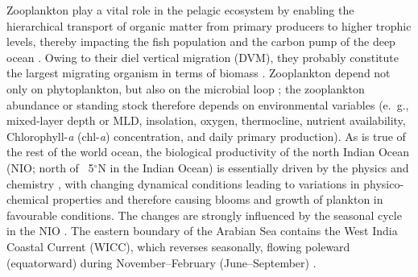 \documentclass[authoryear,review,11pt]{elsarticle}
\newcommand{\chla}{chl-{\emph{a}}}
\begin{document}
Zooplankton play a vital role in the pelagic ecosystem by enabling the hierarchical transport of organic matter from primary producers to higher trophic levels, thereby impacting the fish population \citep{ohman2001density} and the carbon pump of the deep ocean \citep{le2016global}.  Owing to their diel vertical migration (DVM), they probably constitute the largest migrating organism in terms of biomass \citep{hays2003review}. Zooplankton depend not only on phytoplankton, but also on the microbial loop \citep{azam1983microbial}; the zooplankton abundance or standing stock therefore depends on environmental variables (e.~g., mixed-layer depth or MLD, insolation, oxygen, thermocline, nutrient availability, Chlorophyll-\emph{a} (\chla) concentration, and daily primary production). As is true of the rest of the world ocean, the biological productivity of the north Indian Ocean (NIO; north of ~5$^{\circ}$N in the Indian Ocean) is essentially driven by the physics and chemistry \citep[see, for example,][]{subrahmanyan1959studiespart2, banse1968hydrography, banse1995zooplankton, ryther1966primary, nair1970primary, qasim1977biological, levy2007basin, mccreary2009biophysical, vijith2016consequences, shankar2016inhibition, shankar2019role, amol2020modulation}, with changing dynamical conditions leading to variations in physico-chemical properties and therefore causing blooms and growth of plankton in favourable conditions. The changes are strongly influenced by the seasonal cycle in the NIO \citep{banse1968hydrography, mccreary1996four, mccreary2009biophysical, levy2007basin, shankar2019role, aparna2022seasonal}. The eastern boundary of the Arabian Sea contains the West India Coastal Current (WICC), which reverses seasonally, flowing poleward (equatorward) during November--February (June--September) \citep{banse1968hydrography, shetye1990hydrography, shetye19911517, vijith2022circulation, mccreary1993numerical, shankar1997dynamics, shankar2002monsoon}. 

\end{document}
